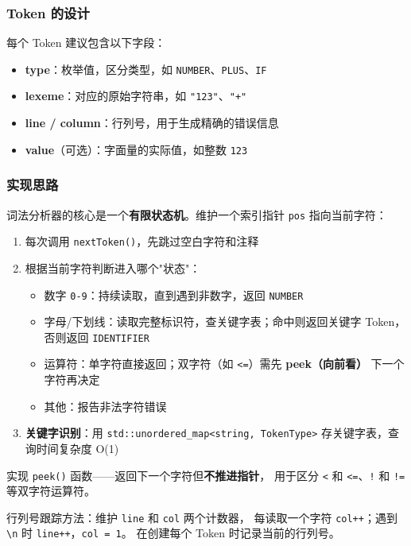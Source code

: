 \documentclass[12pt, a4paper]{ctexart}
\begin{document}
\subsubsection{Token 的设计}

每个 Token 建议包含以下字段：

\begin{itemize}[noitemsep]
  \item \textbf{type}：枚举值，区分类型，如 \texttt{NUMBER}、\texttt{PLUS}、\texttt{IF}
  \item \textbf{lexeme}：对应的原始字符串，如 \texttt{"123"}、\texttt{"+"}
  \item \textbf{line / column}：行列号，用于生成精确的错误信息
  \item \textbf{value}（可选）：字面量的实际值，如整数 \texttt{123}
\end{itemize}

\subsubsection{实现思路}

词法分析器的核心是一个\textbf{有限状态机}。维护一个索引指针 \texttt{pos} 指向当前字符：

\begin{enumerate}
  \item 每次调用 \texttt{nextToken()}，先跳过空白字符和注释
  \item 根据当前字符判断进入哪个"状态"：
    \begin{itemize}[noitemsep]
      \item 数字 \texttt{0-9}：持续读取，直到遇到非数字，返回 \texttt{NUMBER}
      \item 字母/下划线：读取完整标识符，查关键字表；命中则返回关键字 Token，
            否则返回 \texttt{IDENTIFIER}
      \item 运算符：单字符直接返回；双字符（如 \texttt{<=}）需先 \textbf{peek（向前看）}
            下一个字符再决定
      \item 其他：报告非法字符错误
    \end{itemize}
  \item \textbf{关键字识别}：用 \texttt{std::unordered\_map<string, TokenType>}
        存关键字表，查询时间复杂度 O(1)
\end{enumerate}

\begin{tipbox}
实现 \texttt{peek()} 函数——返回下一个字符但\textbf{不推进指针}，
用于区分 \texttt{<} 和 \texttt{<=}、\texttt{!} 和 \texttt{!=} 等双字符运算符。

行列号跟踪方法：维护 \texttt{line} 和 \texttt{col} 两个计数器，
每读取一个字符 \texttt{col++}；遇到 \verb|\n| 时 \texttt{line++}，\texttt{col = 1}。
在创建每个 Token 时记录当前的行列号。
\end{tipbox}
\end{document}
